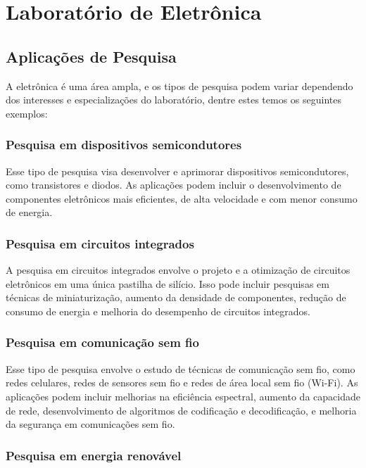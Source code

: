 \section{Laboratório de Eletrônica}

\subsection{Aplicações de Pesquisa}

A eletrônica é uma área ampla, e os tipos de pesquisa podem variar dependendo dos interesses e especializações do laboratório, dentre estes temos os seguintes exemplos:

\subsubsection{Pesquisa em dispositivos semicondutores}

Esse tipo de pesquisa visa desenvolver e aprimorar dispositivos semicondutores, como transistores e diodos. As aplicações podem incluir o desenvolvimento de componentes eletrônicos mais eficientes, de alta velocidade e com menor consumo de energia.

\subsubsection{Pesquisa em circuitos integrados}

A pesquisa em circuitos integrados envolve o projeto e a otimização de circuitos eletrônicos em uma única pastilha de silício. Isso pode incluir pesquisas em técnicas de miniaturização, aumento da densidade de componentes, redução de consumo de energia e melhoria do desempenho de circuitos integrados.

\subsubsection{Pesquisa em comunicação sem fio}

Esse tipo de pesquisa envolve o estudo de técnicas de comunicação sem fio, como redes celulares, redes de sensores sem fio e redes de área local sem fio (Wi-Fi). As aplicações podem incluir melhorias na eficiência espectral, aumento da capacidade de rede, desenvolvimento de algoritmos de codificação e decodificação, e melhoria da segurança em comunicações sem fio.

\subsubsection{Pesquisa em energia renovável}

